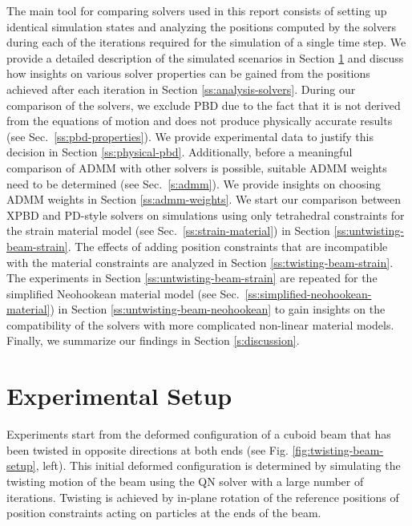 The main tool for comparing solvers used in this report consists of setting up identical simulation states and analyzing the positions computed by the solvers during 
each of the iterations required for the simulation of a single time step. We provide a detailed description of the simulated scenarios in 
Section \ref{ss:experimental-setup} and discuss how insights on various solver properties can be gained from the positions achieved after each iteration in 
Section \ref{ss:analysis-solvers}. During our comparison of the solvers, we exclude PBD due to the fact that it is not derived from the equations of motion and does not produce 
physically accurate results (see Sec.\ \ref{ss:pbd-properties}). We provide experimental data to justify this decision in Section \ref{ss:physical-pbd}. Additionally, before a meaningful 
comparison of ADMM with other solvers is possible, suitable ADMM weights need to be determined (see Sec.\ \ref{s:admm}). We provide insights on choosing ADMM weights in Section \ref{ss:admm-weights}. 
We start our comparison between XPBD and PD-style solvers on simulations using only tetrahedral constraints for the strain material model (see Sec.\ \ref{ss:strain-material}) 
in Section \ref{ss:untwisting-beam-strain}. The effects of adding position constraints that are incompatible with the material constraints are analyzed in 
Section \ref{ss:twisting-beam-strain}. The experiments in Section \ref{ss:untwisting-beam-strain} are repeated for the simplified Neohookean material model (see 
Sec.\ \ref{ss:simplified-neohookean-material}) in Section \ref{ss:untwisting-beam-neohookean} to gain insights on the compatibility of the solvers with more complicated non-linear 
material models. Finally, we summarize our findings in Section \ref{s:discussion}.

\section{Experimental Setup}\label{ss:experimental-setup}
Experiments start from the deformed configuration of a cuboid beam that has been twisted in opposite directions at both ends (see Fig. \ref{fig:twisting-beam-setup}, left).
This initial deformed configuration is determined by simulating the twisting motion of the beam using the QN solver with a large number of iterations. Twisting is achieved by 
in-plane rotation of the reference positions of position constraints acting on particles at the ends of the beam. 

